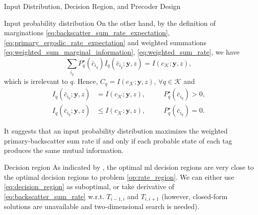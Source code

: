 \documentclass[journal]{IEEEtran}
\begin{document}
\begin{section}{Input Distribution, Decision Region, and Precoder Design}
\begin{subsection}{Input probability distribution}
			On the other hand, by the definition of marginations \eqref{eq:backscatter_sum_rate_expectation}, \eqref{eq:primary_ergodic_rate_expectation} and weighted summations \eqref{eq:weighted_sum_marginal_information}, \eqref{eq:weighted_sum_rate}, we have
			\begin{equation}
				\sum_{i_q} P_q^{\star}(\bar{c}_{i_q}) I_q(\bar{c}_{i_q};\boldsymbol{y},z) = I(c_{\mathcal{K}};\boldsymbol{y},z),
			\end{equation}
			which is irrelevant to $q$. Hence, $C_q = I(c_{\mathcal{K}};\boldsymbol{y},z)$, $\forall q \in \mathcal{K}$ and
			\begin{subequations}
				\begin{alignat}{2}
					I_q(\bar{c}_{i_q};\boldsymbol{y},z) & = I(c_{\mathcal{K}};\boldsymbol{y},z), \quad && P_q^{\star}(\bar{c}_{i_q}) > 0,\\
					I_q(\bar{c}_{i_q};\boldsymbol{y},z) & \le I(c_{\mathcal{K}};\boldsymbol{y},z), \quad && P_q^{\star}(\bar{c}_{i_q}) = 0.
				\end{alignat}
			\end{subequations}

			It suggests that an input probability distribution maximizes the weighted primary-backscatter sum rate if and only if each probable state of each tag produces the same mutual information.
		\end{subsection}


		\begin{subsection}{Decision region}
			As indicated by \cite{Qian2019b}, the optimal \gls{ml} decision regions are very close to the optimal decision regions to problem \eqref{op:rate_region}. We can either use \eqref{eq:decision_region} as suboptimal, or take derivative of \eqref{eq:backscatter_sum_rate} w.r.t. $T_{i-1,i}$ and $T_{i,i+1}$ (however, closed-form solutions are unavailable and two-dimensional search is needed).
		\end{subsection}


\end{section}
\end{document}
